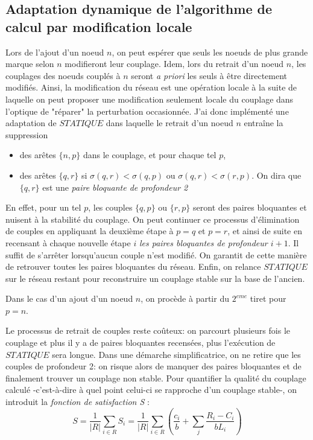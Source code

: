 \documentclass[12pt,a4paper]{article}
\begin{document}
\subsection{Adaptation dynamique de l'algorithme de calcul par modification locale}


Lors de l'ajout d'un noeud $n$, on peut espérer que seuls les noeuds de plus grande marque selon $n$ modifieront leur couplage. 
Idem, lors du retrait d'un noeud $n$, les couplages des noeuds couplés à $n$ seront \textit{a priori} les seuls à être directement modifiés. 
Ainsi, la modification du réseau est une opération locale à la suite de laquelle on peut proposer une modification seulement locale du couplage dans l'optique de "réparer" la perturbation occasionnée.
 J'ai donc implémenté une adaptation de $STATIQUE$ dans laquelle le retrait d'un noeud $n$ entraîne la suppression 
\begin{itemize}
\item des arêtes $\{n, p\}$ dans le couplage, et pour chaque tel $p$,
\item des arêtes $\{q, r\}$ si $\sigma(q, r) < \sigma(q, p)$ ou $\sigma(q, r) < \sigma(r, p)$. On dira que $\{q, r\}$ est une \textit{paire bloquante de profondeur 2}
\end{itemize}

En effet, pour un tel $p$, les couples $\{q, p\}$ ou $\{r, p\}$ seront des paires bloquantes et nuisent à la stabilité du couplage. 
On peut continuer ce processus d'élimination de couples en appliquant la deuxième étape à $p=q$ et $p=r$, et ainsi de suite en recensant à chaque nouvelle étape $i$ \textit{les paires bloquantes de profondeur $i+1$}. 
Il suffit de s'arrêter lorsqu'aucun couple n'est modifié. 
On garantit de cette manière de retrouver toutes les paires bloquantes du réseau. 
Enfin, on relance $STATIQUE$ sur le réseau restant pour reconstruire un couplage stable sur la base de l'ancien. 

Dans le cas d'un ajout d'un noeud $n$, on procède à partir du $2^{eme}$ tiret pour $p=n$. 

Le processus de retrait de couples reste coûteux: on parcourt plusieurs fois le couplage et plus il y a de paires bloquantes recensées, plus l'exécution de $STATIQUE$ sera longue. 
Dans une démarche simplificatrice, on ne retire que les couples de profondeur 2: on risque alors de manquer des paires bloquantes et de finalement trouver un couplage non stable. 
Pour quantifier la qualité du couplage calculé -c'est-à-dire à quel point celui-ci se rapproche d'un couplage stable-, on introduit la \textit{fonction de satisfaction S} \cite{papa}:
\begin{equation}
S = \frac{1}{|R|}\sum_{i\in R}{S_i} = \frac{1}{|R|}\sum_{i\in R}{(\frac{c_i}{b}+\sum_{j}{\frac{R_i - C_i}{bL_i}})}
\end{equation}
\end{document}
